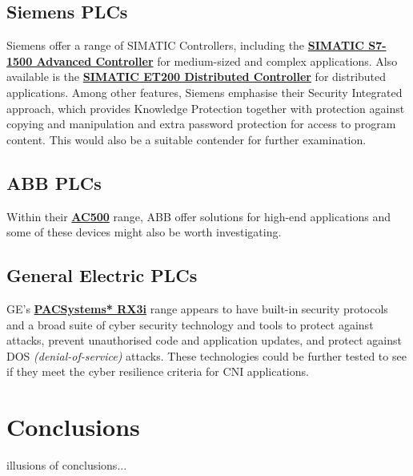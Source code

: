 \subsection{Siemens PLCs}
Siemens offer a range of SIMATIC Controllers, including the \href{https://www.siemens.com/global/en/home/products/automation/systems/industrial/plc/simatic-s7-1500.html}{\textbf{SIMATIC S7-1500 Advanced Controller}} for medium-sized and complex applications. Also available is the \href{https://w3.siemens.com/mcms/distributed-io/en/pages/default.aspx}{\textbf{SIMATIC ET200 Distributed Controller}} for distributed applications. Among other features, Siemens emphasise their Security Integrated approach, which provides Knowledge Protection together with protection against copying and manipulation and extra password protection for access to program content. This would also be a suitable contender for further examination.
\subsection{ABB PLCs}
Within their \href{http://new.abb.com/plc/programmable-logic-controllers-plcs/ac500}{\textbf{AC500}} range, ABB offer solutions for high-end applications and some of these devices might also be worth investigating.
\subsection{General Electric PLCs}
GE's \href{http://www.geautomation.com/products/pacsystems-rx3i-controller}{\textbf{PACSystems* RX3i}} range appears to have built-in security protocols and a broad suite of cyber security technology and tools to protect against attacks, prevent unauthorised code and application updates, and protect against DOS \textit{(denial-of-service)} attacks. These technologies could be further tested to see if they meet the cyber resilience criteria for CNI applications.

\pagebreak
\section{Conclusions}
illusions of conclusions...




